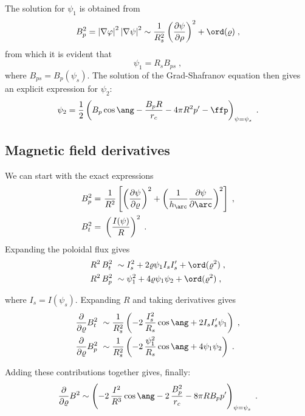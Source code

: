 %
The solution for $\psi_1$ is obtained from 
%
\begin{equation}
B_p^2 = \left|\nabla\varphi\right|^2 \left|\nabla\psi\right|^2 
\sim \frac{1}{R_s^2} \left(\frac{\partial\psi}{\partial\rho}\right)^2 
+ \ord(\varrho) \; ,
\end{equation}
%
from which it is evident that 
%
\begin{equation}
\psi_1 = R_s B_{ps} \; ,
\end{equation}
%
where $B_{ps} = B_p(\psi_s)$.  The solution of the 
Grad-Shafranov equation then gives an explicit expression
for $\psi_2$:
%
\begin{equation}
\psi_2 = \frac{1}{2} \left( B_{p} \cos\ang - \frac{B_{p}R}{r_c} 
-4\pi R^2 p^\prime - \ffp \right)_{\psi = \psi_s} \; .
\end{equation}
 
\subsection{Magnetic field derivatives}

We can start with the exact expressions
%
\begin{align}
B_p^2 = &~\frac{1}{R^2} \left[ 
\left( \frac{\partial\psi}{\partial\varrho} \right)^2+
\left( \frac{1}{h_\arc} \frac{\partial\psi}{\partial \arc} 
  \right)^2 \right] \; , \\
B_t^2 = &~\left( \frac{I(\psi)}{R} \right)^2 \; .
\end{align}
%
Expanding the poloidal flux gives 
%
\begin{align}
R^2\,B_t^2 &~\sim I_s^2 + 2 \varrho \psi_1 I_s I_s^\prime 
+ \ord(\varrho^2) \; , \\
R^2\,B_p^2 &~\sim \psi_1^2 + 4 \varrho \psi_1 \psi_2 
+ \ord(\varrho^2) \; ,
\end{align}

\noindent
where $I_s = I(\psi_s)$.  Expanding $R$ and taking derivatives gives
%
\begin{align}
\frac{\partial}{\partial\varrho} B_t^2 
  &~\sim \frac{1}{R_s^2} \left( -2 \, \frac{I_s^2}{R_s}\cos\ang + 
2 I_s I_s^\prime \psi_1 \right) \; , \\
\frac{\partial}{\partial\varrho} B_p^2 
  &~\sim  \frac{1}{R_s^2} \left( -2 \, \frac{\psi_1^2}{R_s}\cos\ang + 
4 \psi_1 \psi_2 \right) \; .
\end{align}

\noindent
Adding these contributions together gives, finally:
%
\begin{equation}
\frac{\partial}{\partial\varrho} B^2 \sim 
\left( -2\,\frac{I^2}{R^3} \cos\ang - 2\,\frac{B_{p}^2}{r_c} -
8\pi R B_{p} p^\prime \right)_{\psi = \psi_s} \; .
\label{eq.brho}
\end{equation}
 

